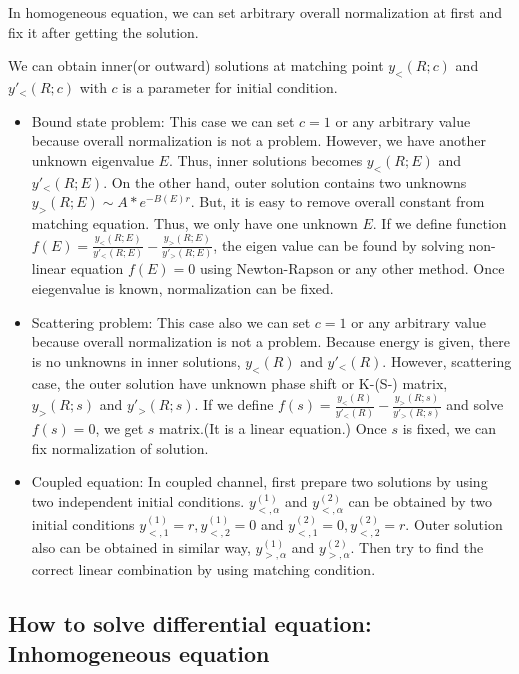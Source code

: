 \documentclass[10pt]{book}
\begin{document}
In homogeneous equation, we can set arbitrary overall normalization at first 
and fix it after getting the solution.

We can obtain inner(or outward) solutions at matching point 
$y_{<}(R;c)$ and $y'_{<}(R;c)$ with $c$ is a parameter for initial condition. 

\begin{itemize}
\item Bound state problem: This case we can set $c=1$ or any arbitrary
      value because overall normalization is not a problem. However,
      we have another unknown eigenvalue $E$. Thus, inner solutions becomes
      $y_{<}(R;E)$ and $y'_{<}(R;E)$. On the other hand, outer solution 
      contains two unknowns $y_{>}(R;E)\sim A*e^{-B(E) r}$. But, it is easy to remove
      overall constant from matching equation. Thus, we only have one unknown $E$.
      If we define function 
      $f(E)=\frac{y_{<}(R;E)}{y'_{<}(R;E)}-\frac{y_{>}(R;E)}{y'_{>}(R;E)}$, 
      the eigen value can be found by solving non-linear equation
      $f(E)=0$ using Newton-Rapson or any other method.
      Once eiegenvalue is known, normalization can be fixed.
      
\item Scattering problem: This case also we can set $c=1$ or any arbitrary
      value because overall normalization is not a problem. Because energy is given,
      there is no unknowns in inner solutions, $y_{<}(R)$ and $y'_{<}(R)$. 
      However, scattering case, the outer solution have unknown phase shift
      or K-(S-) matrix, $y_{>}(R;s)$ and $y'_{>}(R;s)$. If we define 
      $f(s)=\frac{y_{<}(R)}{y'_{<}(R)}-\frac{y_{>}(R;s)}{y'_{>}(R;s)}$ and solve
      $f(s)=0$, we get $s$ matrix.(It is a linear equation.)
      Once $s$ is fixed, we can fix normalization of solution.

\item Coupled equation: In coupled channel, first prepare two solutions by using 
      two independent initial conditions. 
      $y_{<,\alpha }^{(1)}$ and $y_{<,\alpha }^{(2)}$ can be 
      obtained by two initial conditions $y_{<,1}^{(1)}=r,y_{<,2}^{(1)}=0$
      and $y_{<,1}^{(2)}=0,y_{<,2}^{(2)}=r$. 
      Outer solution also can be obtained in similar way,
      $y_{>,\alpha}^{(1)}$ and $y_{>,\alpha}^{(2)}$.
      Then try to find the correct linear combination by using matching condition. 

\end{itemize}


\subsection{How to solve differential equation: Inhomogeneous equation  }
\end{document}
